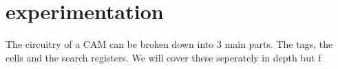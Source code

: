 \section{experimentation}
The circuitry of a CAM can be broken down into 3 main parts. The tags, the cells and the search registers. 
We will cover these seperately in depth but f
